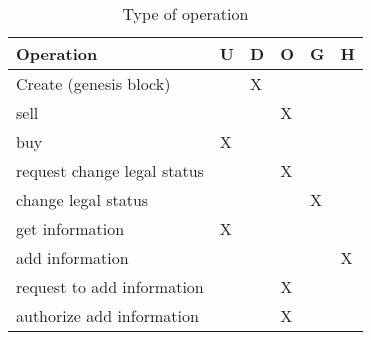 \begin{table}[htb]
\footnotesize
    \begin{center}
    \caption{Type of operation}
    \label{table:operations}
        \begin{tabular}{l|l|l|l|l|l}
        \textbf{Operation}          &\textbf{U}& \textbf{D}&\textbf{O}& \textbf{G}& \textbf{H}\\ \hline
        Create (genesis block)      &          & X         &          &           &           \\ \hline
        sell                        &          &           & X        &           &           \\ \hline
        buy                         & X        &           &          &           &           \\ \hline
        request change legal status &          &           & X        &           &           \\ \hline
        change legal status         &          &           &          & X         &           \\ \hline
        get information             & X        &           &          &           &           \\ \hline
        add information             &          &           &          &           & X         \\ \hline
        request to add information  &          &           & X        &           &           \\ \hline
        authorize add information   &          &           & X        &           &           \\ \hline        
        \end{tabular}
    \end{center}
\end{table}
